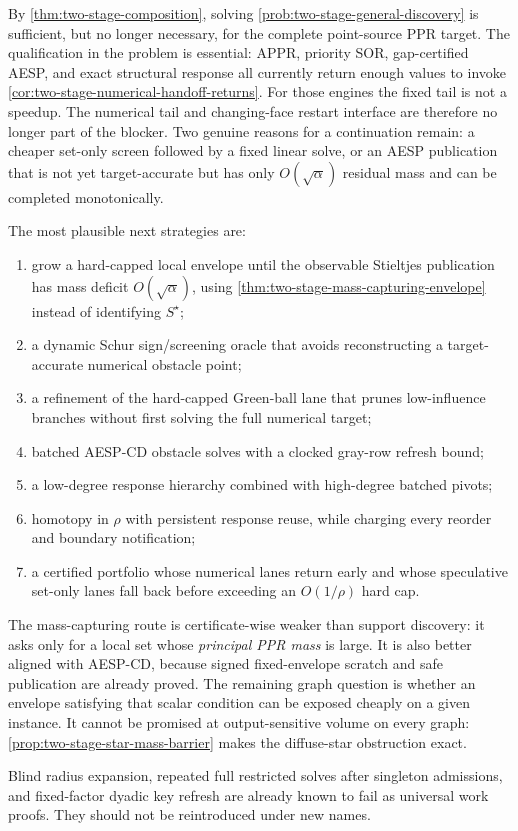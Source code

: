 By \cref{thm:two-stage-composition}, solving
\cref{prob:two-stage-general-discovery} is sufficient, but no longer
necessary, for the complete point-source PPR target.  The qualification in
the problem is essential:
APPR, priority SOR, gap-certified AESP, and exact structural response all
currently return enough values to invoke
\cref{cor:two-stage-numerical-handoff-returns}.  For those engines the fixed
tail is not a speedup.  The numerical tail and changing-face restart interface
are therefore no longer part of the blocker.  Two genuine reasons for a
continuation remain: a cheaper set-only screen followed by a fixed linear
solve, or an AESP publication that is not yet target-accurate but has only
$O(\sqrt\alpha)$ residual mass and can be completed monotonically.

The most plausible next strategies are:
\begin{enumerate}[leftmargin=2.2em]
\item grow a hard-capped local envelope until the observable Stieltjes
  publication has mass deficit $O(\sqrt\alpha)$, using
  \cref{thm:two-stage-mass-capturing-envelope} instead of identifying
  $S^\star$;
\item a dynamic Schur sign/screening oracle that avoids reconstructing a
  target-accurate numerical obstacle point;
\item a refinement of the hard-capped Green-ball lane that prunes
  low-influence branches without first solving the full numerical target;
\item batched AESP-CD obstacle solves with a clocked gray-row refresh bound;
\item a low-degree response hierarchy combined with high-degree batched
  pivots;
\item homotopy in $\rho$ with persistent response reuse, while charging every
  reorder and boundary notification;
\item a certified portfolio whose numerical lanes return early and whose
  speculative set-only lanes fall back before exceeding an $O(1/\rho)$ hard
  cap.
\end{enumerate}

The mass-capturing route is certificate-wise weaker than support discovery:
it asks
only for a local set whose \emph{principal PPR mass} is large.  It is also
better aligned with AESP-CD, because signed fixed-envelope scratch and safe
publication are already proved.  The remaining graph question is whether an
envelope satisfying that scalar condition can be exposed cheaply on a given
instance.  It cannot be promised at output-sensitive volume on every graph:
\cref{prop:two-stage-star-mass-barrier} makes the diffuse-star obstruction
exact.

Blind radius expansion, repeated full restricted solves after singleton
admissions, and fixed-factor dyadic key refresh are already known to fail as
universal work proofs.  They should not be reintroduced under new names.
